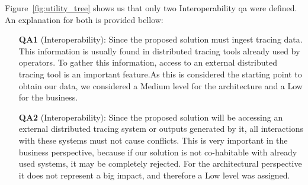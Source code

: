 Figure~\ref{fig:utility_tree} shows us that only two Interoperability \gls{qa} were defined. An explanation for both is provided bellow:

\begin{itemize}
    \item[\textbf{QA1}] (Interoperability): Since the proposed solution must ingest tracing data. This information is usually found in distributed tracing tools already used by operators. To gather this information, access to an external distributed tracing tool is an important feature.As this is considered the starting point to obtain our data, we considered a Medium level for the architecture and a Low for the business.

    \item[\textbf{QA2}] (Interoperability): Since the proposed solution will be accessing an external distributed tracing system or outputs generated by it, all interactions with these systems must not cause conflicts. This is very important in the business perspective, because if our solution is not co-habitable with already used systems, it may be completely rejected. For the architectural perspective it does not represent a big impact, and therefore a Low level was assigned.





\end{itemize}
